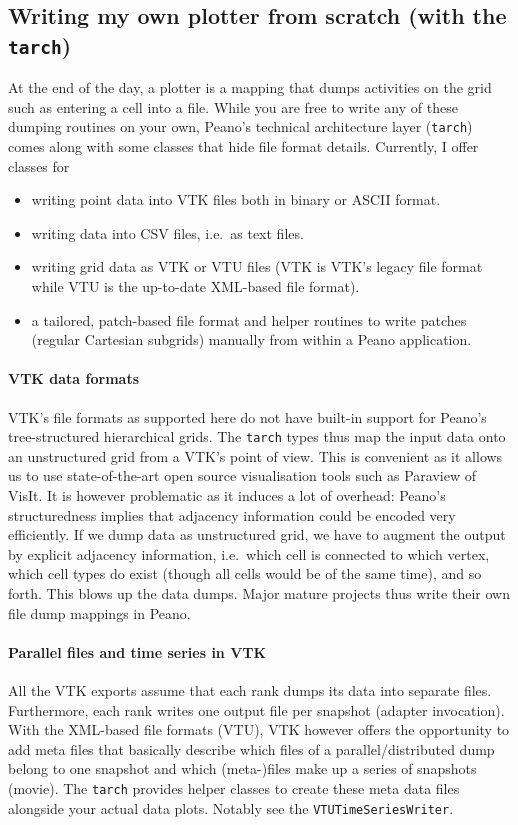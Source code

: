 \subsection{Writing my own plotter from scratch (with the \texttt{tarch})}

At the end of the day, a plotter is a mapping that dumps activities on the
grid such as entering a cell into a file.
While you are free to write any of these dumping routines on your own, Peano's
technical architecture layer (\texttt{tarch}) comes along with some classes that
hide file format details.
Currently, I offer classes for

\begin{itemize}
  \item writing point data into VTK files both in binary or ASCII format.
  \item writing data into CSV files, i.e.~as text files.
  \item writing grid data as VTK or VTU files (VTK is VTK's legacy file format
  while VTU is the up-to-date XML-based file format).
  \item a tailored, patch-based file format and helper routines to write
  patches (regular Cartesian subgrids) manually from within a Peano application.
\end{itemize}


\paragraph{VTK data formats}
VTK's file formats as supported here do not have built-in support for Peano's
tree-structured hierarchical grids.
The \texttt{tarch} types thus map the input data onto an unstructured grid from
a VTK's point of view.
This is convenient as it allows us to use state-of-the-art open source
visualisation tools such as Paraview of VisIt.
It is however problematic as it induces a lot of overhead: Peano's
structuredness implies that adjacency information could be encoded very
efficiently.
If we dump data as unstructured grid, we have to augment the output by explicit
adjacency information, i.e.~which cell is connected to which vertex, which cell
types do exist (though all cells would be of the same time), and so forth.
This blows up the data dumps.
Major mature projects thus write their own file dump mappings in Peano.


\paragraph{Parallel files and time series in VTK}
All the VTK exports assume that each rank dumps its data into separate files.
Furthermore, each rank writes one output file per snapshot (adapter invocation).
With the XML-based file formats (VTU), VTK however offers the opportunity to add
meta files that basically describe which files of a parallel/distributed dump
belong to one snapshot and which (meta-)files make up a series of snapshots
(movie).
The \texttt{tarch} provides helper classes to create these meta data files
alongside your actual data plots.
Notably see the \texttt{VTUTimeSeriesWriter}.


